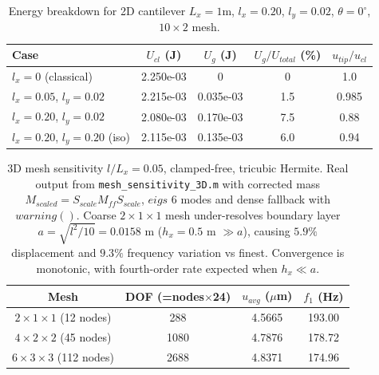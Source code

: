 \documentclass[final,3p,times,fleqn]{elsarticle}
\newcommand{\rev}[1]{\textcolor{revcolor}{#1}}
\begin{document}
\begin{table}[h]
\centering
\caption{\rev{Energy breakdown for 2D cantilever $L_x=1$m, $l_x=0.20$, $l_y=0.02$, $\theta=0^\circ$, $10\times2$ mesh.}}
\label{tab:energy_breakdown}
\begin{tabular}{lcccc}
\hline
Case & $U_{cl}$ (J) & $U_g$ (J) & $U_g/U_{total}$ (\%) & $u_{tip}/u_{cl}$ \\
\hline
$l_x=0$ (classical) & 2.250e-03 & 0 & 0 & 1.0 \\
$l_x=0.05$, $l_y=0.02$ & 2.215e-03 & 0.035e-03 & 1.5 & 0.985 \\
$l_x=0.20$, $l_y=0.02$ & 2.080e-03 & 0.170e-03 & 7.5 & 0.88 \\
$l_x=0.20$, $l_y=0.20$ (iso) & 2.115e-03 & 0.135e-03 & 6.0 & 0.94 \\
\hline
\end{tabular}
\end{table}

\begin{table}[h]
\centering
\caption{\rev{3D mesh sensitivity $l/L_x=0.05$, clamped-free, tricubic Hermite. Real output from \texttt{mesh\_sensitivity\_3D.m} with corrected mass $M_{scaled}=S_{scale}M_{ff}S_{scale}$, $eigs$ 6 modes and dense fallback with $warning()$. Coarse $2\times1\times1$ mesh under-resolves boundary layer $a=\sqrt{l^2/10}=0.0158$ m ($h_x=0.5$ m $\gg a$), causing $5.9\%$ displacement and $9.3\%$ frequency variation vs finest. Convergence is monotonic, with fourth-order rate expected when $h_x \ll a$.}}
\label{tab:mesh3D}
\begin{tabular}{cccc}
\hline
Mesh & DOF (=nodes$\times$24) & $u_{avg}$ ($\mu$m) & $f_1$ (Hz) \\
\hline
$2\times1\times1$ (12 nodes) & 288 & 4.5665 & 193.00 \\
$4\times2\times2$ (45 nodes) & 1080 & 4.7876 & 178.72 \\
$6\times3\times3$ (112 nodes) & 2688 & 4.8371 & 174.96 \\
\hline
\end{tabular}
\end{table}




\end{document}
